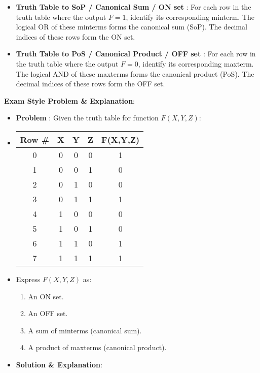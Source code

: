 \documentclass{article}
\begin{document}
\begin{itemize}
\begin{itemize}
        \begin{itemize}
            \item \textbf{Truth Table to SoP / Canonical Sum / ON set} : For each row in the truth table where the output $F=1$, identify its corresponding minterm. The logical OR of these minterms forms the canonical sum (SoP). The decimal indices of these rows form the ON set.
            \item \textbf{Truth Table to PoS / Canonical Product / OFF set} : For each row in the truth table where the output $F=0$, identify its corresponding maxterm. The logical AND of these maxterms forms the canonical product (PoS). The decimal indices of these rows form the OFF set.
        \end{itemize}
\end{itemize}

\textbf{Exam Style Problem \& Explanation}:

\begin{itemize}
    \item \textbf{Problem} : Given the truth table for function $F(X,Y,Z)$:
    \item \begin{tabular}{|c|c|c|c|c|} \\ \hline
Row \# & X & Y & Z & F(X,Y,Z) \\ \hline
 0 & 0 & 0 & 0 & 1 \\ 1 & 0 & 0 & 1 & 0 \\ 2 & 0 & 1 & 0 & 0 \\ 3 & 0 & 1 & 1 & 1 \\ 4 & 1 & 0 & 0 & 0 \\ 5 & 1 & 0 & 1 & 0 \\ 6 & 1 & 1 & 0 & 1 \\ 7 & 1 & 1 & 1 & 1 \\ \hline

\end{tabular}

    \item Express $F(X,Y,Z)$ as:
    
        \begin{enumerate}
            \item An ON set.
            \item An OFF set.
            \item A sum of minterms (canonical sum).
            \item A product of maxterms (canonical product).
        \end{enumerate}
    \item \textbf{Solution \& Explanation}:
    

\end{itemize}
\end{itemize}
\end{document}
